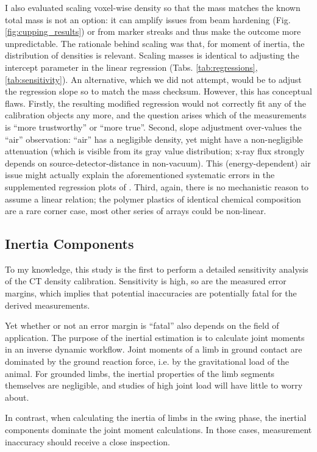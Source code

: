I also evaluated scaling voxel-wise density so that the mass matches the known total mass is not an option: it can amplify issues from beam hardening (Fig. \ref{fig:cupping_results}) or from marker streaks and thus make the outcome more unpredictable.
The rationale behind scaling was that, for moment of inertia, the distribution of densities is relevant.
Scaling masses is identical to adjusting the intercept parameter in the linear regression (Tabs. \ref{tab:regressions}, \ref{tab:sensitivity}).
An alternative, which we did not attempt, would be to adjust the regression slope so to match the mass checksum.
However, this has conceptual flaws.
Firstly, the resulting modified regression would not correctly fit any of the calibration objects any more, and the question arises which of the measurements is ``more trustworthy'' or ``more true''.
Second, slope adjustment over-values the ``air'' observation: ``air'' has a negligible density, yet might have a non-negligible attenuation (which is visible from its gray value distribution; x-ray flux strongly depends on source-detector-distance in non-vacuum).
This (energy-dependent) air issue might actually explain the aforementioned systematic errors in the supplemented regression plots of \citet{Durston2022}.
Third, again, there is no mechanistic reason to assume a linear relation; the polymer plastics of identical chemical composition are a rare corner case, most other series of arrays could be non-linear.


\subsection{Inertia Components}
\label{sec:orgaad4540}
To my knowledge, this study is the first to perform a detailed sensitivity analysis of the CT density calibration.
Sensitivity is high, so are the measured error margins, which implies that potential inaccuracies are potentially fatal for the derived measurements.

Yet whether or not an error margin is ``fatal'' also depends on the field of application.
The purpose of the inertial estimation is to calculate joint moments in an inverse dynamic workflow.
Joint moments of a limb in ground contact are dominated by the ground reaction force, i.e. by the gravitational load of the animal.
For grounded limbs, the inertial properties of the limb segments themselves are negligible, and studies of high joint load will have little to worry about.

In contrast, when calculating the inertia of limbs in the swing phase, the inertial components dominate the joint moment calculations.
In those cases, measurement inaccuracy should receive a close inspection.


